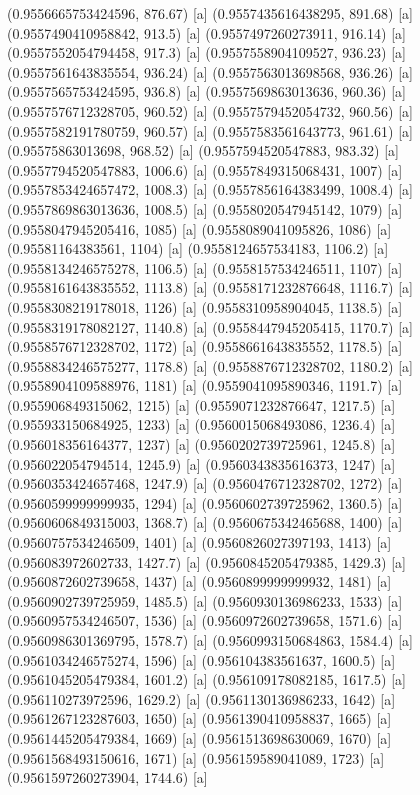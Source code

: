 {{{(0.9556665753424596, 876.67) [a] 
(0.9557435616438295, 891.68) [a] 
(0.9557490410958842, 913.5) [a] 
(0.9557497260273911, 916.14) [a] 
(0.9557552054794458, 917.3) [a] 
(0.9557558904109527, 936.23) [a] 
(0.9557561643835554, 936.24) [a] 
(0.9557563013698568, 936.26) [a] 
(0.9557565753424595, 936.8) [a] 
(0.9557569863013636, 960.36) [a] 
(0.9557576712328705, 960.52) [a] 
(0.9557579452054732, 960.56) [a] 
(0.9557582191780759, 960.57) [a] 
(0.9557583561643773, 961.61) [a] 
(0.95575863013698, 968.52) [a] 
(0.9557594520547883, 983.32) [a] 
(0.9557794520547883, 1006.6) [a] 
(0.9557849315068431, 1007) [a] 
(0.9557853424657472, 1008.3) [a] 
(0.9557856164383499, 1008.4) [a] 
(0.9557869863013636, 1008.5) [a] 
(0.9558020547945142, 1079) [a] 
(0.9558047945205416, 1085) [a] 
(0.9558089041095826, 1086) [a] 
(0.95581164383561, 1104) [a] 
(0.9558124657534183, 1106.2) [a] 
(0.9558134246575278, 1106.5) [a] 
(0.9558157534246511, 1107) [a] 
(0.9558161643835552, 1113.8) [a] 
(0.9558171232876648, 1116.7) [a] 
(0.9558308219178018, 1126) [a] 
(0.9558310958904045, 1138.5) [a] 
(0.9558319178082127, 1140.8) [a] 
(0.9558447945205415, 1170.7) [a] 
(0.9558576712328702, 1172) [a] 
(0.9558661643835552, 1178.5) [a] 
(0.9558834246575277, 1178.8) [a] 
(0.9558876712328702, 1180.2) [a] 
(0.9558904109588976, 1181) [a] 
(0.9559041095890346, 1191.7) [a] 
(0.955906849315062, 1215) [a] 
(0.9559071232876647, 1217.5) [a] 
(0.955933150684925, 1233) [a] 
(0.9560015068493086, 1236.4) [a] 
(0.956018356164377, 1237) [a] 
(0.9560202739725961, 1245.8) [a] 
(0.956022054794514, 1245.9) [a] 
(0.9560343835616373, 1247) [a] 
(0.9560353424657468, 1247.9) [a] 
(0.9560476712328702, 1272) [a] 
(0.9560599999999935, 1294) [a] 
(0.9560602739725962, 1360.5) [a] 
(0.9560606849315003, 1368.7) [a] 
(0.9560675342465688, 1400) [a] 
(0.9560757534246509, 1401) [a] 
(0.9560826027397193, 1413) [a] 
(0.956083972602733, 1427.7) [a] 
(0.9560845205479385, 1429.3) [a] 
(0.9560872602739658, 1437) [a] 
(0.9560899999999932, 1481) [a] 
(0.9560902739725959, 1485.5) [a] 
(0.9560930136986233, 1533) [a] 
(0.9560957534246507, 1536) [a] 
(0.9560972602739658, 1571.6) [a] 
(0.9560986301369795, 1578.7) [a] 
(0.9560993150684863, 1584.4) [a] 
(0.9561034246575274, 1596) [a] 
(0.956104383561637, 1600.5) [a] 
(0.9561045205479384, 1601.2) [a] 
(0.956109178082185, 1617.5) [a] 
(0.956110273972596, 1629.2) [a] 
(0.9561130136986233, 1642) [a] 
(0.9561267123287603, 1650) [a] 
(0.9561390410958837, 1665) [a] 
(0.9561445205479384, 1669) [a] 
(0.9561513698630069, 1670) [a] 
(0.9561568493150616, 1671) [a] 
(0.956159589041089, 1723) [a] 
(0.9561597260273904, 1744.6) [a] 
}}}
